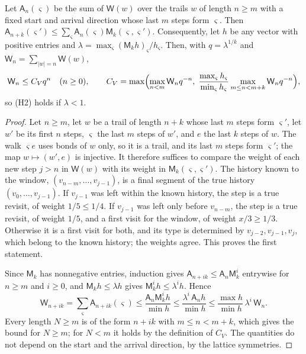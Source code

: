 \begin{lemma}\label{l:alm}
Let $\mathsf A_n(\varsigma)$ be the sum of $\mathsf W(w)$ over the trails $w$ of length $n \ge m$ with a fixed start and arrival direction whose last $m$ steps form $\varsigma$. Then $\mathsf A_{n + k}(\varsigma') \le \sum_\varsigma \mathsf A_n(\varsigma) \mathsf M_k(\varsigma, \varsigma')$. Consequently, let $h$ be any vector with positive entries and $\lambda = \max_\varsigma (\mathsf M_k h)_\varsigma / h_\varsigma$. Then, with $q = \lambda^{1/k}$ and $\mathsf W_n = \sum_{|w| = n} \mathsf W(w)$,
\begin{equation*}
\mathsf W_n \le C_V q^n \quad (n \ge 0), \qquad C_V = \max\Bigl( \max_{n < m} \mathsf W_n q^{-n}, \; \frac{\max_\varsigma h_\varsigma}{\min_\varsigma h_\varsigma} \max_{m \le n < m + k} \mathsf W_n q^{-n} \Bigr),
\end{equation*}
so (H2) holds if $\lambda < 1$.
\end{lemma}

\begin{proof}
Let $n \ge m$, let $w$ be a trail of length $n + k$ whose last $m$ steps form $\varsigma'$, let $w'$ be its first $n$ steps, $\varsigma$ the last $m$ steps of $w'$, and $e$ the last $k$ steps of $w$. The walk $\varsigma e$ uses bonds of $w$ only, so it is a trail, and its last $m$ steps form $\varsigma'$; the map $w \mapsto (w', e)$ is injective. It therefore suffices to compare the weight of each new step $j > n$ in $\mathsf W(w)$ with its weight in $\mathsf M_k(\varsigma, \varsigma')$. The history known to the window, $(v_{n - m}, \dots, v_{j - 1})$, is a final segment of the true history $(v_0, \dots, v_{j - 1})$. If $v_{j - 1}$ was left within the known history, the step is a true revisit, of weight $1/5 \le 1/4$. If $v_{j - 1}$ was left only before $v_{n - m}$, the step is a true revisit, of weight $1/5$, and a first visit for the window, of weight $x/3 \ge 1/3$. Otherwise it is a first visit for both, and its type is determined by $v_{j - 2}, v_{j - 1}, v_j$, which belong to the known history; the weights agree. This proves the first statement.

Since $\mathsf M_k$ has nonnegative entries, induction gives $\mathsf A_{n + ik} \le \mathsf A_n \mathsf M_k^i$ entrywise for $n \ge m$ and $i \ge 0$, and $\mathsf M_k h \le \lambda h$ gives $\mathsf M_k^i h \le \lambda^i h$. Hence
\begin{equation*}
\mathsf W_{n + ik} = \sum_\varsigma \mathsf A_{n + ik}(\varsigma) \le \frac{\mathsf A_n \mathsf M_k^i h}{\min h} \le \frac{\lambda^i \, \mathsf A_n h}{\min h} \le \frac{\max h}{\min h} \, \lambda^i \, \mathsf W_n .
\end{equation*}
Every length $N \ge m$ is of the form $n + ik$ with $m \le n < m + k$, which gives the bound for $N \ge m$; for $N < m$ it holds by the definition of $C_V$. The quantities do not depend on the start and the arrival direction, by the lattice symmetries.
\end{proof}

